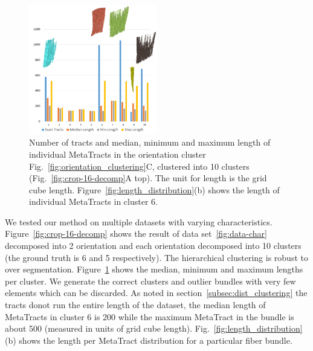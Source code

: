 \begin{figure}
\centering
	\includegraphics[width=0.5\textwidth]{imagesMT2014/Graph_crop16.PNG}
	\caption{Number of tracts and median, minimum and maximum length of individual MetaTracts in the orientation cluster Fig.~\ref{fig:orientation_clustering}C, clustered into 10 clusters (Fig.~\ref{fig:crop-16-decomp}A top). The unit for length is the grid cube length. Figure~\ref{fig:length_distribution}(b) shows the length of individual MetaTracts in cluster 6.}
	\label{fig:len_dist_crop16}
\end{figure}









We tested our method on multiple datasets with varying characteristics. 
Figure~\ref{fig:crop-16-decomp} shows the result of data set~\ref{fig:data-char} decomposed into 2 orientation and each orientation decomposed into 10 clusters (the ground truth is 6 and 5 respectively). The hierarchical clustering is robust to over segmentation.
Figure~\ref{fig:len_dist_crop16} shows the median, minimum and maximum lengths per cluster. We generate the correct clusters and outlier bundles with very few elements which can be discarded. As noted in section~\ref{subsec:dist_clustering} the tracts donot run the entire length of the dataset, the median length of MetaTracts in cluster 6 is 200 while the maximum MetaTract in the bundle is about 500 (measured in units of grid cube length). Fig.~\ref{fig:length_distribution}(b) shows the length per MetaTract distribution for a particular fiber bundle. 


